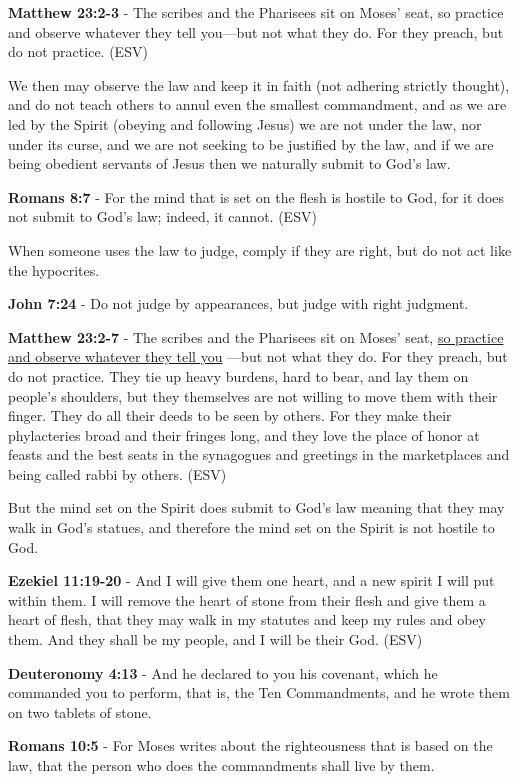 \documentclass[11pt]{article}
\begin{document}
\textbf{Matthew 23:2-3} - The scribes and the Pharisees sit on Moses' seat, so practice and observe whatever they tell you—but not what they do. For they preach, but do not practice. (ESV)

We then may observe the law and keep it in faith (not adhering strictly thought), and do not teach others to annul even the smallest commandment, and as we are led by the Spirit (obeying and following Jesus) we are not under the law, nor under its curse, and we are not seeking to be justified by the law, and if we are being obedient servants of Jesus then we naturally submit to God's law.

\textbf{Romans 8:7} - For the mind that is set on the flesh is hostile to God, for it does not submit to God's law; indeed, it cannot. (ESV)

When someone uses the law to judge, comply if they are right, but do not act like the hypocrites.

\textbf{John 7:24} - Do not judge by appearances, but judge with right judgment.

\textbf{Matthew 23:2-7} - The scribes and the Pharisees sit on Moses' seat, \uline{so practice and observe whatever they tell you} —but not what they do. For they preach, but do not practice. They tie up heavy burdens, hard to bear, and lay them on people's shoulders, but they themselves are not willing to move them with their finger. They do all their deeds to be seen by others. For they make their phylacteries broad and their fringes long, and they love the place of honor at feasts and the best seats in the synagogues and greetings in the marketplaces and being called rabbi by others. (ESV)

But the mind set on the Spirit does submit to God's law meaning that they may walk in God's statues, and therefore the mind set on the Spirit is not hostile to God.

\textbf{Ezekiel 11:19-20} - And I will give them one heart, and a new spirit I will put within them. I will remove the heart of stone from their flesh and give them a heart of flesh, that they may walk in my statutes and keep my rules and obey them. And they shall be my people, and I will be their God. (ESV)

\textbf{Deuteronomy 4:13} - And he declared to you his covenant, which he commanded you to perform, that is, the Ten Commandments, and he wrote them on two tablets of stone.

\textbf{Romans 10:5} - For Moses writes about the righteousness that is based on the law, that the person who does the commandments shall live by them.
\end{document}
